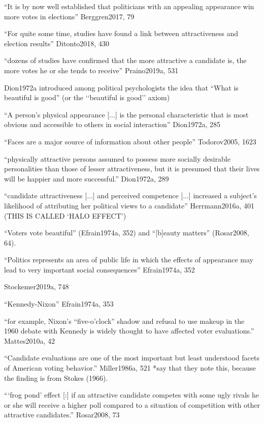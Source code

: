
		``It is by now well established that politicians with an appealing appearance win more votes in elections'' Berggren2017, 79

		``For quite some time, studies have found a link between attractiveness and election results'' Ditonto2018, 430

		``dozens of studies have confirmed that the more attractive a candidate is, the more votes he or she tends to receive'' Praino2019a, 531

Dion1972a introduced among political psychologists the idea that ``What is beautiful is good'' (or the ‘‘beautiful is good’’ axiom)

``A person's physical appearance [...] is the personal characteristic that is most obvious and accessible to others in social interaction'' Dion1972a, 285

``Faces are a major source of information about other people'' Todorov2005, 1623

``physically attractive persons assumed to possess more socially desirable personalities than those of lesser attractiveness, but it is presumed that their lives will be happier and more successful.'' Dion1972a, 289

``candidate attractiveness [...] and perceived competence [...] increased a subject's likelihood of attributing her political views to a candidate'' Herrmann2016a, 401 (THIS IS CALLED `HALO EFFECT')

``Voters vote beautiful'' (Efrain1974a, 352) and ``[b]eauty matters'' (Rosar2008, 64).

``Politics represents an area of public life in which the effects of appearance may lead to very important social consequences'' Efrain1974a, 352


		Stockemer2019a, 748

		``Kennedy-Nixon'' Efrain1974a, 353

		``for example, Nixon’s “five-o’clock” shadow and refusal to use makeup in the 1960 debate with Kennedy is widely thought to have affected voter evaluations.'' Mattes2010a, 42

``Candidate evaluations are one of the most important but least understood facets of American voting behavior.'' Miller1986a, 521 *say that they note this, because the finding is from Stokes (1966).

``‘frog pond’ effect [:] if an attractive candidate competes with some ugly rivals he or she will receive a higher poll compared to a situation of competition with other attractive candidates.'' Rosar2008, 73

